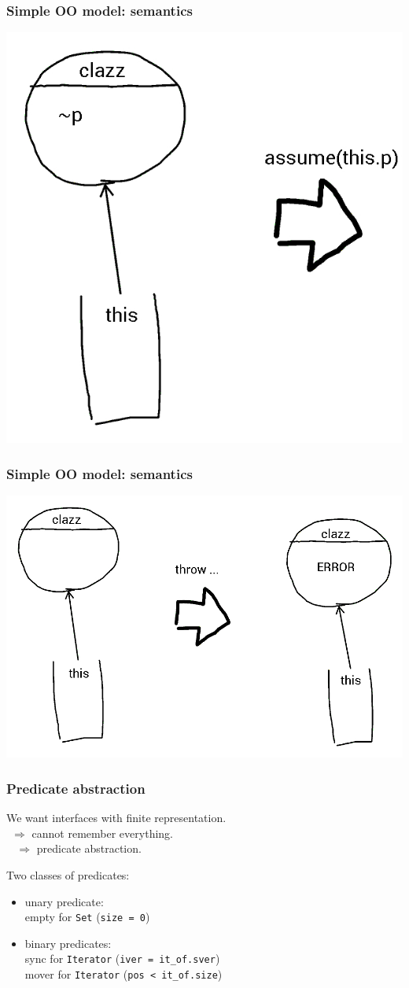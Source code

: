 \documentclass{beamer}
\begin{document}
\begin{frame}
  \frametitle{Simple OO model: semantics}
  \includegraphics[width=0.6\linewidth]{assume_fail}
\end{frame}

\begin{frame}
  \frametitle{Simple OO model: semantics}
  \includegraphics[width=\linewidth]{throw}
\end{frame}

\begin{frame}
  \frametitle{Predicate abstraction}

  We want interfaces with finite representation.\\
  $\mbox{}\ \ \Rightarrow$ cannot remember everything.\\
  $\mbox{}\ \ \ \ \Rightarrow$ predicate abstraction.

  \vspace{4ex}

  Two classes of predicates:
  \begin{itemize}
  \item unary predicate:\\
    empty for {\tt Set} ({\tt size = 0})
  \item binary predicates:\\
    sync for {\tt Iterator} ({\tt iver = it\_of.sver})\\
    mover for {\tt Iterator} ({\tt pos < it\_of.size})\\
  \end{itemize}

\end{frame}
\end{document}
